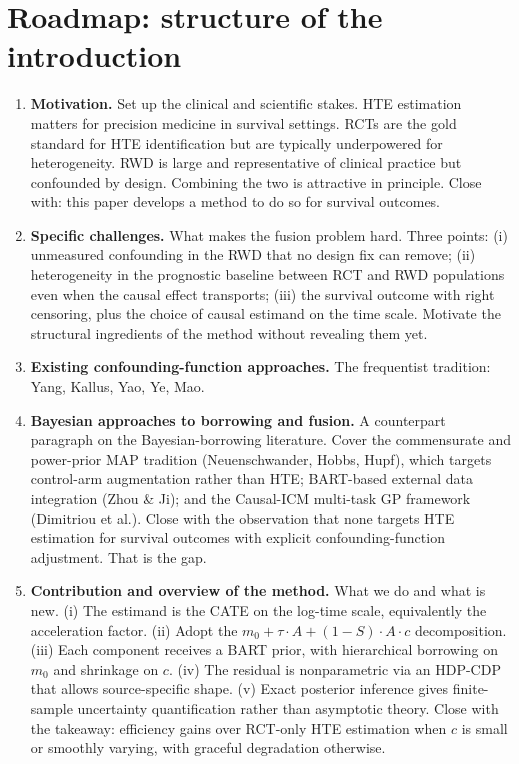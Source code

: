 \newpage


\section*{Roadmap: structure of the introduction}

\begin{enumerate}
  \item \textbf{Motivation.} Set up the clinical and scientific stakes.
        HTE estimation matters for precision medicine in survival settings.
        RCTs are the gold standard for HTE identification but are typically underpowered for heterogeneity.
        RWD is large and representative of clinical practice but confounded by design.
        Combining the two is attractive in principle.
        Close with: this paper develops a method to do so for survival outcomes.
  \item \textbf{Specific challenges.} What makes the fusion problem hard.
        Three points: (i) unmeasured confounding in the RWD that no design fix can remove; (ii) heterogeneity in the prognostic baseline between RCT and RWD populations even when the causal effect transports; (iii) the survival outcome with right censoring, plus the choice of causal estimand on the time scale.
        Motivate the structural ingredients of the method without revealing them yet.
  \item \textbf{Existing confounding-function approaches.} The frequentist tradition: Yang, Kallus, Yao, Ye, Mao.
  \item \textbf{Bayesian approaches to borrowing and fusion.} A counterpart paragraph on the Bayesian-borrowing literature.
        Cover the commensurate and power-prior MAP tradition (Neuenschwander, Hobbs, Hupf), which targets control-arm augmentation rather than HTE; BART-based external data integration (Zhou \& Ji); and the Causal-ICM multi-task GP framework (Dimitriou et al.).
        Close with the observation that none targets HTE estimation for survival outcomes with explicit confounding-function adjustment.
        That is the gap.
  \item \textbf{Contribution and overview of the method.} What we do and what is new.
        (i) The estimand is the CATE on the log-time scale, equivalently the acceleration factor.
        (ii) Adopt the $m_0 + \tau \cdot A + (1-S)\cdot A \cdot c$ decomposition.
        (iii) Each component receives a BART prior, with hierarchical borrowing on $m_0$ and shrinkage on $c$.
        (iv) The residual is nonparametric via an HDP-CDP that allows source-specific shape.
        (v) Exact posterior inference gives finite-sample uncertainty quantification rather than asymptotic theory.
        Close with the takeaway: efficiency gains over RCT-only HTE estimation when $c$ is small or smoothly varying, with graceful degradation otherwise.
\end{enumerate}

